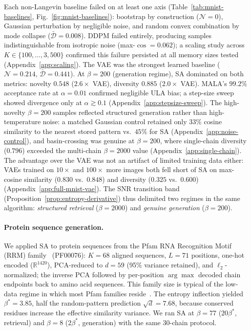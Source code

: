 Each non-Langevin baseline failed on at least one axis (Table~\ref{tab:mnist-baselines}, Fig.~\ref{fig:mnist-baselines}): bootstrap by construction ($\mathcal{N}{=}0$), Gaussian perturbation by negligible noise, and random convex combination by mode collapse ($\bar{\mathcal{D}}{=}0.008$). DDPM failed entirely, producing samples indistinguishable from isotropic noise (max-$\cos{=}0.062$); a scaling study across $K\in\{100,\dots,3{,}500\}$ confirmed this failure persisted at all memory sizes tested (Appendix~\ref{app:scaling}). The VAE was the strongest learned baseline ($\mathcal{N}{=}0.214$, $\bar{\mathcal{D}}{=}0.441$). At $\beta{=}200$ (generation regime), SA dominated on both metrics: novelty $0.548$ ($2.6{\times}$ VAE), diversity $0.885$ ($2.0{\times}$ VAE). MALA's $99.2\%$ acceptance rate at $\alpha{=}0.01$ confirmed negligible ULA bias; a step-size sweep showed divergence only at $\alpha{\gtrsim}0.1$ (Appendix~\ref{app:stepsize-sweep}). The high-novelty $\beta{=}200$ samples reflected structured generation rather than high-temperature noise: a matched Gaussian control retained only $33\%$ cosine similarity to the nearest stored pattern vs.\ $45\%$ for SA (Appendix~\ref{app:noise-control}), and basin-crossing was genuine at $\beta{=}200$, where single-chain diversity ($0.796$) exceeded the multi-chain $\beta{=}2000$ value (Appendix~\ref{app:single-chain}). The advantage over the VAE was not an artifact of limited training data either: VAEs trained on $10{\times}$ and $100{\times}$ more images both fell short of SA on max-cosine similarity ($0.830$ vs.\ $0.848$) and diversity ($0.325$ vs.\ $0.600$) (Appendix~\ref{app:full-mnist-vae}). The SNR transition band (Proposition~\ref{prop:entropy-derivative}) thus delimited two regimes in the same algorithm: \emph{structured retrieval} ($\beta{=}2000$) and \emph{genuine generation} ($\beta{=}200$).

\paragraph{Protein sequence generation.}
We applied SA to protein sequences from the Pfam RNA Recognition Motif (RRM) family~\cite{mistryPfamProteinFamilies2021} (PF00076): $K{=}68$ aligned sequences, $L{=}71$ positions, one-hot encoded ($\mathbb{R}^{1420}$), PCA-reduced to $d{=}59$ (95\% variance retained), and $\ell_2$-normalized; the inverse PCA followed by per-position $\arg\max$ decoded chain endpoints back to amino acid sequences. This family size is typical of the low-data regime in which most Pfam families reside~\cite{finnPfamProteinFamilies2008}. The entropy inflection yielded $\beta^*{=}3.85$, half the random-pattern prediction $\sqrt{d}{=}7.68$, because conserved residues increase the effective similarity variance. We ran SA at $\beta{=}77$ ($20\beta^*$, retrieval) and $\beta{=}8$ ($2\beta^*$, generation) with the same 30-chain protocol.

